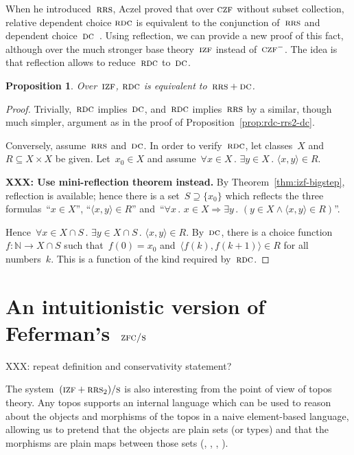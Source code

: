 \documentclass[oneside,reqno]{amsart}
\theoremstyle{definition}
\theoremstyle{plain}
\newtheorem{prop}[defn]{Proposition}
\theoremstyle{remark}
\newcommand{\NN}{\mathbb{N}}
\renewcommand{\_}{\mathpunct{.}\,}
\newcommand{\?}{\,{:}\,}
\newcommand{\IZF}{\textsc{izf}}
\newcommand{\CZF}{\textsc{czf}}
\newcommand{\ZFCS}{\textsc{zfc/s}}
\newcommand{\RRS}{\textsc{rrs}}
\newcommand{\RDC}{\textsc{rdc}}
\newcommand{\DC}{\textsc{dc}}
\newcommand{\ES}{(\IZF+\RRS_2)/\textsc{s}}
\begin{document}
When he introduced~$\RRS$, Aczel proved that over $\CZF$ without subset
collection, relative dependent choice $\RDC$ is equivalent to the conjunction
of~$\RRS$ and dependent choice~$\DC$~\cite[Theorem~2.4]{aczel:rrs}. Using
reflection, we can provide a new proof of this fact, although over the much
stronger base theory~$\IZF$ instead of~$\CZF^{-}$. The idea is that reflection
allows to reduce~$\RDC$ to~$\DC$.

\begin{prop}Over~$\IZF$, $\RDC$ is equivalent to~$\RRS + \DC$.
\end{prop}

\begin{proof}Trivially,~$\RDC$ implies~$\DC$, and~$\RDC$ implies~$\RRS$ by a
similar, though much simpler, argument as in the proof of
Proposition~\ref{prop:rdc-rrs2-dc}.

Conversely, assume~$\RRS$ and~$\DC$. In order to verify~$\RDC$, let classes~$X$
and~$R \subseteq X \times X$ be given. Let~$x_0 \in X$ and assume~$\forall x
\in X\_ \exists y \in X\_ \langle x,y \rangle \in R$.

\textbf{XXX: Use mini-reflection theorem instead.}
By Theorem~\ref{thm:izf-bigstep}, reflection is available; hence there is a
set~$S \supseteq \{x_0\}$ which reflects the three formulas~``$x \in X$'', ``$\langle x,y
\rangle \in R$'' and~``$\forall x\_ x \in X \Rightarrow \exists y\_ (y \in X \wedge \langle x,y
\rangle \in R)$''.

Hence~$\forall x \in X \cap S\_ \exists y \in X \cap S\_ \langle x,y \rangle
\in R$. By~$\DC$, there is a choice function~$f : \NN \to X \cap S$ such
that~$f(0) = x_0$ and~$\langle f(k), f(k+1) \rangle \in R$ for all numbers~$k$.
This is a function of the kind required by~$\RDC$.
\end{proof}


\section{An intuitionistic version of Feferman's~$\ZFCS$}
\label{sect:appl-smallness}

XXX: repeat definition and conservativity statement?

The system~$\ES$ is also interesting from the point of view of topos theory.
Any topos supports an internal language which can be used to reason about the
objects and morphisms of the topos in a naive element-based language, allowing
us to pretend that the objects are plain sets (or types) and that the morphisms
are plain maps between those sets (\cite[Chapter~6]{borceux:handbook3},
\cite[Section~1.3]{caramello:ttt}, \cite[Chapter~14]{goldblatt:topoi},
\cite[Chapter~VI]{moerdijk-maclane:sheaves-logic}).
\end{document}
